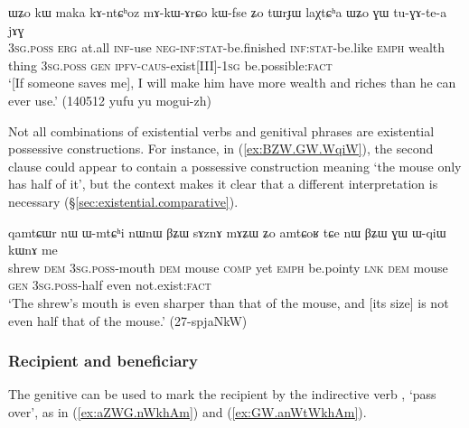 \begin{exe} 
\ex \label{ex:WZo.GW.tuGAtea} 
\gll ɯʑo kɯ maka kɤ-ntɕʰoz mɤ-kɯ-ɤrɕo kɯ-fse ʑo tɯrɟɯ laχtɕʰa ɯʑo ɣɯ tu-ɣɤ-te-a jɤɣ \\ 
\textsc{3sg}.\textsc{poss} \textsc{erg} at.all \textsc{inf}-use \textsc{neg}-\textsc{inf}:\textsc{stat}-be.finished \textsc{inf}:\textsc{stat}-be.like \textsc{emph} wealth thing \textsc{3sg}.\textsc{poss} \textsc{gen} \textsc{ipfv}-\textsc{caus}-exist[III]-\textsc{1sg} be.possible:\textsc{fact} \\ 
\glt `[If someone saves me], I will make him have more wealth and riches than he can ever use.' (140512 yufu yu mogui-zh) 
\end{exe} 

Not all combinations of existential verbs and genitival phrases are existential possessive constructions. For instance, in (\ref{ex:BZW.GW.WqiW}), the second clause could appear to contain a possessive construction meaning `the mouse only has half of it', but the context makes it clear that a different interpretation is necessary (§\ref{sec:existential.comparative}).

\begin{exe}
\ex \label{ex:BZW.GW.WqiW}
\gll qamtɕɯr nɯ ɯ-mtɕʰi nɯnɯ βʑɯ sɤznɤ mɤʑɯ ʑo amtɕoʁ tɕe nɯ βʑɯ ɣɯ ɯ-qiɯ kɯnɤ me \\
shrew \textsc{dem} \textsc{3sg}.\textsc{poss}-mouth \textsc{dem} mouse \textsc{comp} yet \textsc{emph} be.pointy \textsc{lnk} \textsc{dem} mouse \textsc{gen} \textsc{3sg}.\textsc{poss}-half even not.exist:\textsc{fact} \\
\glt `The shrew's mouth is even sharper than that of the mouse, and [its size] is not even half that of the mouse.' (27-spjaNkW)
\end{exe}




\subsubsection{Recipient and beneficiary} \label{sec:gen.beneficiary}
  
 
The genitive can be used to mark the recipient by the indirective verb , `pass over', as in (\ref{ex:aZWG.nWkhAm}) and (\ref{ex:GW.anWtWkhAm}).   

